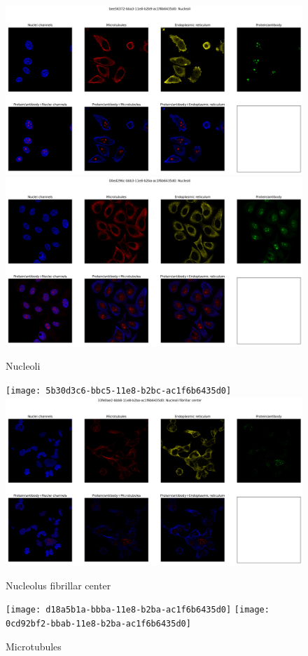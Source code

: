 \documentclass[]{article}
\begin{document}
\begin{figure}
	\caption{Nucleoli}
	\includegraphics[width=\textwidth]{bee56372-bba3-11e8-b2b9-ac1f6b6435d0}
	\includegraphics[width=\textwidth]{00ed296c-bbb3-11e8-b2ba-ac1f6b6435d0}
\end{figure}

\begin{figure}
	\caption{Nucleolus fibrillar center}
	\texttt{[image: 5b30d3c6-bbc5-11e8-b2bc-ac1f6b6435d0]}
	\includegraphics[width=\textwidth]{33fe0ae2-bbb8-11e8-b2ba-ac1f6b6435d0}
\end{figure}

\begin{figure}
	\caption{Microtubules}
	\texttt{[image: d18a5b1a-bbba-11e8-b2ba-ac1f6b6435d0]}
	\texttt{[image: 0cd92bf2-bbab-11e8-b2ba-ac1f6b6435d0]}
\end{figure}

\clearpage


\printacronyms
\printglossary



\end{document}
